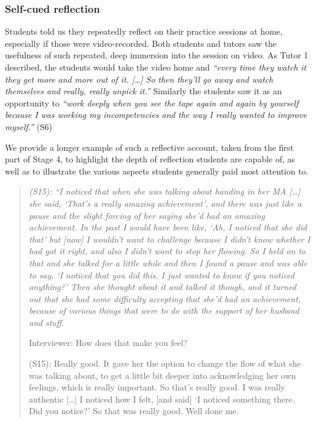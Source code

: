 \documentclass{sigchi}
\newcommand{\qq}[2]{\textrm{\textit{``#2''}}}
\begin{document}
\subsubsection{Self-cued reflection}
Students told us they repeatedly reflect on their practice sessions at home, especially if those were video-recorded. Both students and tutors saw the usefulness of such repeated, deep immersion into the session on video.  As Tutor 1 described, the students would take the video home and \qq{}{every time they watch it they get more and more out of it. [\dots]  So then they'll go away and watch themselves and really, really unpick it.} Similarly the students saw it as an opportunity to \qq{}{work deeply when you see the tape again and again by yourself because I was working my incompetencies and the way I really wanted to improve myself.} (S6) 

We provide a longer example of such a reflective account, taken from the first part of Stage 4, to highlight the depth of reflection students are capable of, as well as to illustrate the various aspects students generally paid most attention to. 
\begin{quotation}
{\itshape
\noindent 
(S15): ``I noticed that when she was talking about handing in her MA [\dots] she said, `That's a really amazing achievement', and there was just like a pause and the slight forcing of her saying she'd had an amazing achievement. In the past I would have been like, `Ah, I noticed that she did that' but [now] I wouldn't want to challenge because I didn't know whether I had got it right, and also I didn't want to stop her flowing. So I held on to that and she talked for a little while and then I found a pause and was able to say, `I noticed that you did this. I just wanted to know if you noticed anything?' Then she thought about it and talked it though, and it turned out that she had some difficulty accepting that she'd had an achievement, because of various things that were to do with the support of her husband and stuff. \smallskip	

\noindent Interviewer: How does that make you feel?	\smallskip

\noindent (S15): Really good. It gave her the option to change the flow of what she was talking about, to get a little bit deeper into acknowledging her own feelings, which is really important. So that's really good. I was really authentic [\dots] I noticed how I felt, [and said] `I noticed something there. Did you notice?' So that was really good. Well done me.
}
\end{quotation} 
\end{document}
